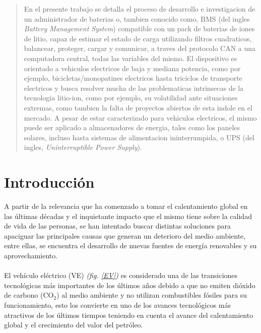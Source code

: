 \documentclass[10pt,a4paper]{article}
\begin{document}
    \begin{abstract}
        \noindent En el presente trabajo se detalla el proceso de desarrollo e
        investigacion de un administrador de baterias o, tambien conocido como,
        BMS (del ingles \emph{Battery Management System}) compatible con un pack
        de baterias de iones de litio, capaz de estimar el estado de carga 
        utilizando filtros cuadraticos, balancear, proteger, cargar y 
        comunicar, a traves del protocolo CAN a una computadora central, todas 
        las variables del mismo. El dispositivo es orientado a vehiculos 
        electricos de baja y mediana potencia, como por ejemplo, 
        bicicletas/monopatines electricos hasta triciclos de transporte 
        electricos y busca resolver mucha de las problematicas intrinsecas de 
        la tecnologia litio-ion, como por ejemplo, su volatilidad ante 
        situaciones extremas, como tambien la falta de proyectos abiertos de 
        esta indole en el mercado. A pesar de estar caracterizado para 
        vehiculos electricos, el mismo puede ser aplicado a almacenadores de 
        energia, tales como los paneles solares, incluso hasta
        sistemas de alimentacion ininterrumpida, o UPS (del ingles,
        \emph{Uninterruptible Power Supply}).
    \end{abstract}
	
    \clearpage

	\tableofcontents

    \clearpage

	\section{Introducción}
	
	\noindent A partir de la relevancia que ha comenzado a tomar el 
    calentamiento global en las últimas décadas y el inquietante impacto que 
    el mismo tiene sobre la calidad de vida de las personas, se han intentado 
    buscar distintas soluciones para apaciguar las principales causas que 
    generan un deterioro del medio ambiente, entre ellas, se encuentra el 
    desarrollo de nuevas fuentes de energía renovables y su aprovechamiento.\\ 
	\\
    \noindent El vehículo eléctrico (VE) \emph{(fig. \ref{EV})} es considerado 
    una de las transiciones tecnológicas más importantes de los últimos años 
    debido a que no emiten dióxido de carbono ($\mathrm{CO_2}$) al medio 
    ambiente y no utilizan combustibles fósiles para su funcionamiento, esto 
    los convierte en uno de los avances tecnológicos más atractivos de los 
    últimos tiempos teniendo en cuenta el avance del calentamiento global y el 
    crecimiento del valor del petróleo.
\end{document}
